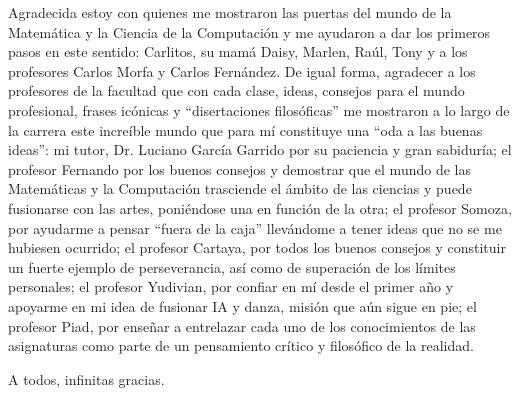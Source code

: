\begin{acknowledgements}
Agradecida estoy con quienes me mostraron las puertas del mundo de la Matem\'atica y la Ciencia de la Computaci\'on y me ayudaron a dar los primeros pasos en este sentido: Carlitos, su mam\'a Daisy, Marlen, Ra\'ul, Tony y a los profesores Carlos Morfa y Carlos Fern\'andez. De igual forma, agradecer a los profesores de la facultad que con cada clase, ideas, consejos para el mundo profesional, frases ic\'onicas y ``disertaciones filos\'oficas'' me mostraron a lo largo de la carrera este incre\'ible mundo que para m\'i constituye una ``oda a las buenas ideas'': mi tutor, Dr. Luciano Garc\'ia Garrido por su paciencia y gran sabidur\'ia; el profesor Fernando por los buenos consejos y demostrar que el mundo de las Matem\'aticas y la Computaci\'on trasciende el \'ambito de las ciencias y puede fusionarse con las artes, poni\'endose una en funci\'on de la otra; el profesor Somoza, por ayudarme a pensar ``fuera de la caja'' llev\'andome a tener ideas que no se me hubiesen ocurrido; el profesor Cartaya, por todos los buenos consejos y constituir un fuerte ejemplo de perseverancia, as\'i como de superaci\'on de los l\'imites personales; el profesor Yudivian, por confiar en m\'i desde el primer a\~no y apoyarme en mi idea de fusionar IA y danza, misi\'on que a\'un sigue en pie; el profesor Piad, por ense\~nar a entrelazar cada uno de los conocimientos de las asignaturas como parte de un pensamiento cr\'itico y filos\'ofico de la realidad.

A todos, infinitas gracias.

\end{acknowledgements}